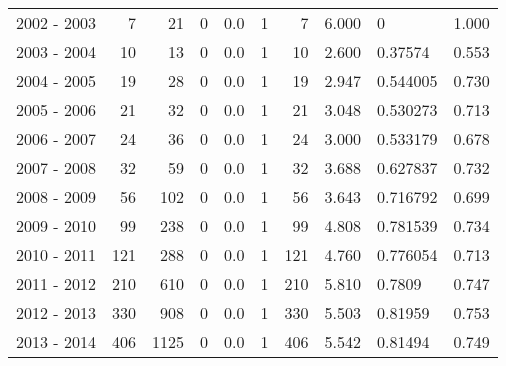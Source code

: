 \begin{tabular}{lrrrrrrrlr}
2002 - 2003 &        7 &       21 &                 0 &               0.0 &                       1 &                          7 &       6.000 &          0 &             1.000 \\
2003 - 2004 &       10 &       13 &                 0 &               0.0 &                       1 &                         10 &       2.600 &    0.37574 &             0.553 \\
2004 - 2005 &       19 &       28 &                 0 &               0.0 &                       1 &                         19 &       2.947 &   0.544005 &             0.730 \\
2005 - 2006 &       21 &       32 &                 0 &               0.0 &                       1 &                         21 &       3.048 &   0.530273 &             0.713 \\
2006 - 2007 &       24 &       36 &                 0 &               0.0 &                       1 &                         24 &       3.000 &   0.533179 &             0.678 \\
2007 - 2008 &       32 &       59 &                 0 &               0.0 &                       1 &                         32 &       3.688 &   0.627837 &             0.732 \\
2008 - 2009 &       56 &      102 &                 0 &               0.0 &                       1 &                         56 &       3.643 &   0.716792 &             0.699 \\
2009 - 2010 &       99 &      238 &                 0 &               0.0 &                       1 &                         99 &       4.808 &   0.781539 &             0.734 \\
2010 - 2011 &      121 &      288 &                 0 &               0.0 &                       1 &                        121 &       4.760 &   0.776054 &             0.713 \\
2011 - 2012 &      210 &      610 &                 0 &               0.0 &                       1 &                        210 &       5.810 &     0.7809 &             0.747 \\
2012 - 2013 &      330 &      908 &                 0 &               0.0 &                       1 &                        330 &       5.503 &    0.81959 &             0.753 \\
2013 - 2014 &      406 &     1125 &                 0 &               0.0 &                       1 &                        406 &       5.542 &    0.81494 &             0.749 \\

\end{tabular}
